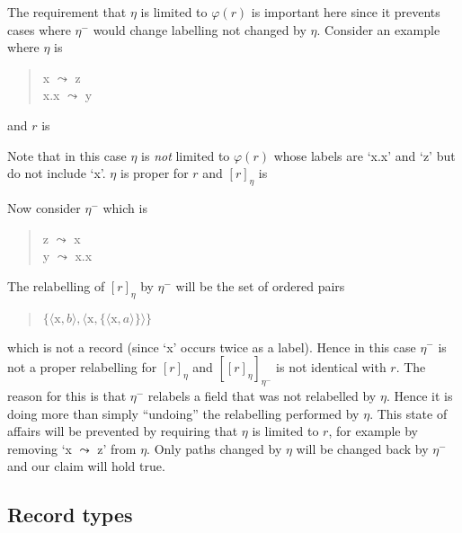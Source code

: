 The
requirement that $\eta$ is limited to $\varphi(r)$ is important here
since it prevents cases where $\eta^-$ would change labelling not
changed by $\eta$.  Consider an example where $\eta$ is 
\begin{quote}
x $\leadsto$ z\\
x.x $\leadsto$ y
\end{quote}
and $r$ is
\begin{quote}
\end{quote}
Note that in this case $\eta$ is \textit{not} limited to $\varphi(r)$ whose
labels are `x.x' and `z' but do not include `x'.  $\eta$ is
proper for $r$ and $[r]_\eta$ is
\begin{quote}
\end{quote}
Now consider $\eta^-$ which is
\begin{quote}
z $\leadsto$ x\\
y $\leadsto$ x.x
\end{quote}
The relabelling of $[r]_\eta$ by $\eta^-$ will be the set of ordered
pairs
\begin{quote}
$\{\langle\mathrm{x},b\rangle,\langle\mathrm{x},\{\langle\mathrm{x},a\rangle\}\rangle\}$
\end{quote}
which is not a record (since `x' occurs twice as a label).  Hence in
this case $\eta^-$ is not a proper relabelling for $[r]_\eta$ and
$[[r]_\eta]_{\eta^-}$ is not identical with $r$.  The reason for this
is that $\eta^-$ relabels a field that was not relabelled by $\eta$.
Hence it is doing more than simply ``undoing'' the relabelling
performed by $\eta$.  This state of affairs will be prevented by
requiring that $\eta$ is limited to $r$, for example by removing `x
$\leadsto$ z' from $\eta$.  Only paths changed by $\eta$ will be
changed back by $\eta^-$ and our claim will hold true.


\subsection{Record types}
\label{app:rectypes}




